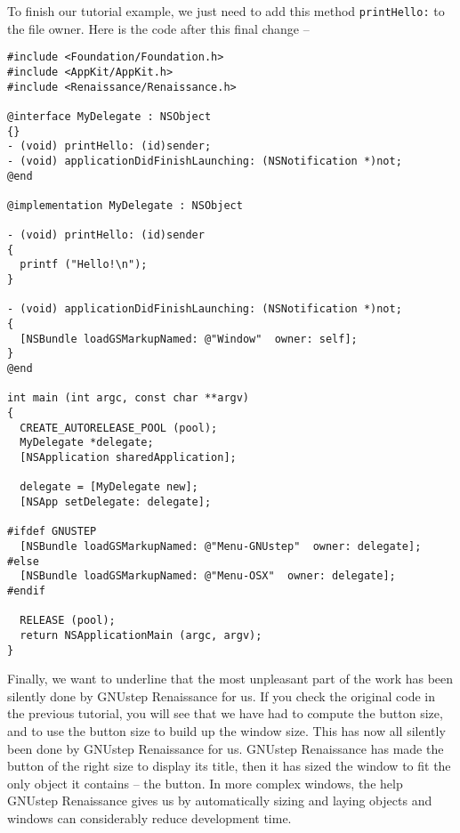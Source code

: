 \documentclass[a4paper]{article}
\begin{document}
To finish our tutorial example, we just need to add this method
\texttt{printHello:} to the file owner.  Here is the code after this
final change --
\begin{verbatim}
#include <Foundation/Foundation.h>
#include <AppKit/AppKit.h>
#include <Renaissance/Renaissance.h>

@interface MyDelegate : NSObject
{}
- (void) printHello: (id)sender;
- (void) applicationDidFinishLaunching: (NSNotification *)not;
@end

@implementation MyDelegate : NSObject 

- (void) printHello: (id)sender
{
  printf ("Hello!\n");
}

- (void) applicationDidFinishLaunching: (NSNotification *)not;
{
  [NSBundle loadGSMarkupNamed: @"Window"  owner: self];
}
@end

int main (int argc, const char **argv)
{ 
  CREATE_AUTORELEASE_POOL (pool);
  MyDelegate *delegate;
  [NSApplication sharedApplication];

  delegate = [MyDelegate new];
  [NSApp setDelegate: delegate];

#ifdef GNUSTEP
  [NSBundle loadGSMarkupNamed: @"Menu-GNUstep"  owner: delegate];
#else
  [NSBundle loadGSMarkupNamed: @"Menu-OSX"  owner: delegate];
#endif

  RELEASE (pool);
  return NSApplicationMain (argc, argv);
}
\end{verbatim}

Finally, we want to underline that the most unpleasant part of the
work has been silently done by GNUstep Renaissance for us.  If you
check the original code in the previous tutorial, you will see that we
have had to compute the button size, and to use the button size to
build up the window size.  This has now all silently been done by
GNUstep Renaissance for us.  GNUstep Renaissance has made the button
of the right size to display its title, then it has sized the window
to fit the only object it contains -- the button.  In more complex
windows, the help GNUstep Renaissance gives us by automatically sizing
and laying objects and windows can considerably reduce development
time.
\end{document}
